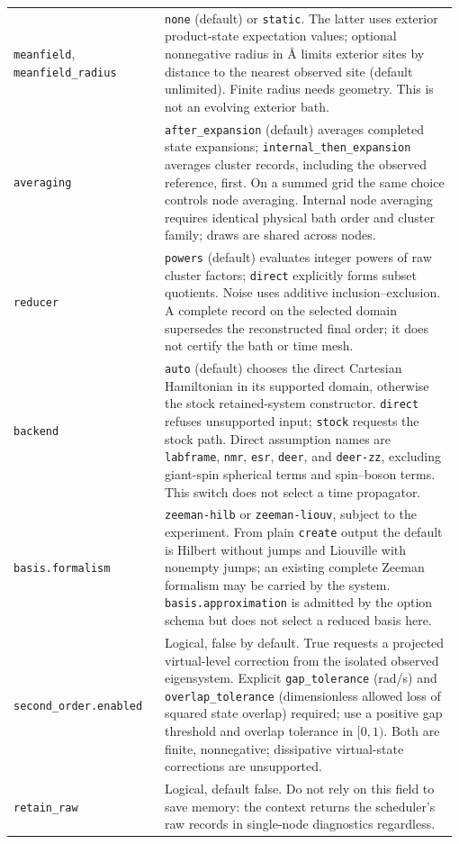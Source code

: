 \documentclass[11pt,a4paper]{article}
\newcommand{\code}[1]{\texttt{#1}}
\begin{document}
\begin{longtable}{@{}>{\raggedright\arraybackslash}p{0.335\linewidth}@{\hspace{0.025\linewidth}}>{\raggedright\arraybackslash}p{0.64\linewidth}@{}}
\code{meanfield}, \code{meanfield\_radius} & \code{none} (default) or \code{static}. The latter uses exterior product-state expectation values; optional nonnegative radius in \AA{} limits exterior sites by distance to the nearest observed site (default unlimited). Finite radius needs geometry. This is not an evolving exterior bath.\\
\code{averaging} & \code{after\_expansion} (default) averages completed state expansions; \code{internal\_then\_expansion} averages cluster records, including the observed reference, first. On a summed grid the same choice controls node averaging. Internal node averaging requires identical physical bath order and cluster family; draws are shared across nodes.\\
\code{reducer} & \code{powers} (default) evaluates integer powers of raw cluster factors; \code{direct} explicitly forms subset quotients. Noise uses additive inclusion--exclusion. A complete record on the selected domain supersedes the reconstructed final order; it does not certify the bath or time mesh.\\
\code{backend} & \code{auto} (default) chooses the direct Cartesian Hamiltonian in its supported domain, otherwise the stock retained-system constructor. \code{direct} refuses unsupported input; \code{stock} requests the stock path. Direct assumption names are \code{labframe}, \code{nmr}, \code{esr}, \code{deer}, and \code{deer-zz}, excluding giant-spin spherical terms and spin--boson terms. This switch does not select a time propagator.\\
\code{basis.formalism} & \code{zeeman-hilb} or \code{zeeman-liouv}, subject to the experiment. From plain \code{create} output the default is Hilbert without jumps and Liouville with nonempty jumps; an existing complete Zeeman formalism may be carried by the system. \code{basis.approximation} is admitted by the option schema but does not select a reduced basis here.\\
\code{second\_order.enabled} & Logical, false by default. True requests a projected virtual-level correction from the isolated observed eigensystem. Explicit \code{gap\_tolerance} (rad/s) and \code{overlap\_tolerance} (dimensionless allowed loss of squared state overlap) required; use a positive gap threshold and overlap tolerance in $[0,1)$. Both are finite, nonnegative; dissipative virtual-state corrections are unsupported.\\
\code{retain\_raw} & Logical, default false. Do not rely on this field to save memory: the context returns the scheduler's raw records in single-node diagnostics regardless.\\
\end{longtable}
\endgroup
\end{document}
